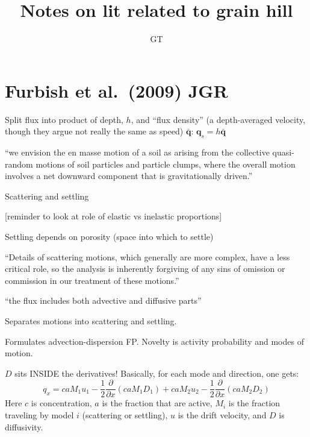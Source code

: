 \documentclass[12pt, oneside]{article}   	%
\title{Notes on lit related to grain hill}
\author{GT}
\begin{document}
\maketitle

\section*{Furbish et al.~(2009) JGR}

Split flux into product of depth, $h$, and ``flux density'' (a depth-averaged velocity, though they argue not really the same as speed) $\bar{\mathbf{q}}$: $\mathbf{q}_s = h \bar{\mathbf{q}}$

``we envision the en masse motion of a soil as arising from the collective quasi-random motions of soil particles and particle clumps, where the overall motion involves a net downward component that is gravitationally driven.''

Scattering and settling

[reminder to look at role of elastic vs inelastic proportions]

Settling depends on porosity (space into which to settle)

``Details of scattering motions, which generally are more complex, have a less critical role, so the analysis is inherently forgiving of any sins of omission or commission in our treatment of these motions.''

``the flux includes both advective and diffusive parts''

Separates motions into scattering and settling.

Formulates advection-dispersion FP. Novelty is activity probability and modes of motion.

$D$ sits INSIDE the derivatives! Basically, for each mode and direction, one gets:
\begin{equation}
q_x = c a M_1 u_1 - \frac{1}{2} \frac{\partial}{\partial x} ( c a M_1 D_1 ) +  c a M_2 u_2 - \frac{1}{2} \frac{\partial}{\partial x} ( c a M_2 D_2 )
\end{equation}
Here $c$ is concentration, $a$ is the fraction that are active, $M_i$ is the fraction traveling by model $i$ (scattering or settling), $u$ is the drift velocity, and $D$ is diffusivity.











\end{document}
